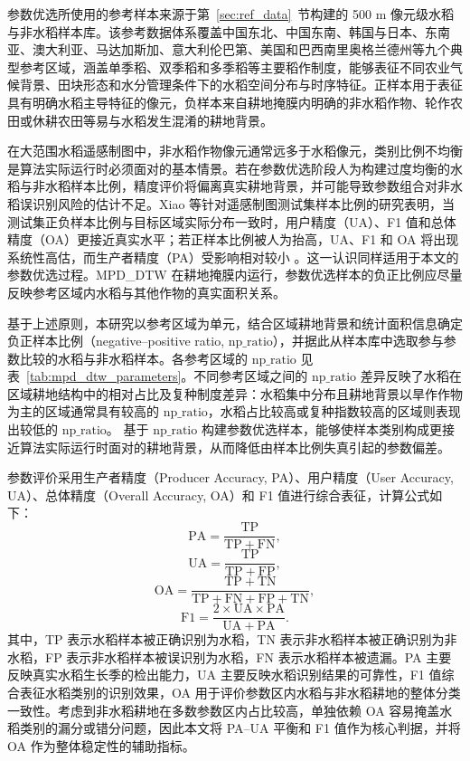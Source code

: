参数优选所使用的参考样本来源于第~\ref{sec:ref_data}~节构建的 500 m 像元级水稻与非水稻样本库。该参考数据体系覆盖中国东北、中国东南、韩国与日本、东南亚、澳大利亚、马达加斯加、意大利伦巴第、美国和巴西南里奥格兰德州等九个典型参考区域，涵盖单季稻、双季稻和多季稻等主要稻作制度，能够表征不同农业气候背景、田块形态和水分管理条件下的水稻空间分布与时序特征。正样本用于表征具有明确水稻主导特征的像元，负样本来自耕地掩膜内明确的非水稻作物、轮作农田或休耕农田等易与水稻发生混淆的耕地背景。

在大范围水稻遥感制图中，非水稻作物像元通常远多于水稻像元，类别比例不均衡是算法实际运行时必须面对的基本情景。若在参数优选阶段人为构建过度均衡的水稻与非水稻样本比例，精度评价将偏离真实耕地背景，并可能导致参数组合对非水稻误识别风险的估计不足。Xiao 等针对遥感制图测试集样本比例的研究表明，当测试集正负样本比例与目标区域实际分布一致时，用户精度（UA）、F1 值和总体精度（OA）更接近真实水平；若正样本比例被人为抬高，UA、F1 和 OA 将出现系统性高估，而生产者精度（PA）受影响相对较小 \cite{Xiao2024JAG}。这一认识同样适用于本文的参数优选过程。MPD\_DTW 在耕地掩膜内运行，参数优选样本的负正比例应尽量反映参考区域内水稻与其他作物的真实面积关系。

基于上述原则，本研究以参考区域为单元，结合区域耕地背景和统计面积信息确定负正样本比例（negative--positive ratio, $\mathrm{np\_ratio}$），并据此从样本库中选取参与参数比较的水稻与非水稻样本。各参考区域的 $\mathrm{np\_ratio}$ 见表~\ref{tab:mpd_dtw_parameters}。不同参考区域之间的 $\mathrm{np\_ratio}$ 差异反映了水稻在区域耕地结构中的相对占比及复种制度差异：水稻集中分布且耕地背景以旱作作物为主的区域通常具有较高的 $\mathrm{np\_ratio}$，水稻占比较高或复种指数较高的区域则表现出较低的 $\mathrm{np\_ratio}$。
基于 $\mathrm{np\_ratio}$ 构建参数优选样本，能够使样本类别构成更接近算法实际运行时面对的耕地背景，从而降低由样本比例失真引起的参数偏差。

参数评价采用生产者精度（Producer Accuracy, PA）、用户精度（User Accuracy, UA）、总体精度（Overall Accuracy, OA）和 F1 值进行综合表征，计算公式如下：
\begin{equation}
    \mathrm{PA}=\frac{\mathrm{TP}}{\mathrm{TP}+\mathrm{FN}},\label{eq:PA}
\end{equation}
\begin{equation}
    \mathrm{UA}=\frac{\mathrm{TP}}{\mathrm{TP}+\mathrm{FP}},\label{eq:UA}
\end{equation}
\begin{equation}
    \mathrm{OA}=\frac{\mathrm{TP}+\mathrm{TN}}{\mathrm{TP}+\mathrm{FN}+\mathrm{FP}+\mathrm{TN}},
    \label{eq:OA}
\end{equation}
\begin{equation}
    \mathrm{F1}=\frac{2\times\mathrm{UA}\times\mathrm{PA}}{\mathrm{UA}+\mathrm{PA}}.
    \label{eq:F1}
\end{equation}
其中，TP 表示水稻样本被正确识别为水稻，TN 表示非水稻样本被正确识别为非水稻，FP 表示非水稻样本被误识别为水稻，FN 表示水稻样本被遗漏。PA 主要反映真实水稻生长季的检出能力，UA 主要反映水稻识别结果的可靠性，F1 值综合表征水稻类别的识别效果，OA 用于评价参数区内水稻与非水稻耕地的整体分类一致性。考虑到非水稻耕地在多数参数区内占比较高，单独依赖 OA 容易掩盖水稻类别的漏分或错分问题，因此本文将 PA--UA 平衡和 F1 值作为核心判据，并将 OA 作为整体稳定性的辅助指标。

